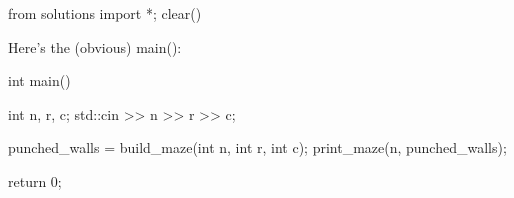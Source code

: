 \begin{python0}
from solutions import *; clear()
\end{python0}











Here's the (obvious) main():
\begin{console}
int main()
{
    int n, r, c;
    std::cin >> n >> r >> c;

    punched_walls = build_maze(int n, int r, int c);
    print_maze(n, punched_walls);

    return 0;
}
\end{console}
